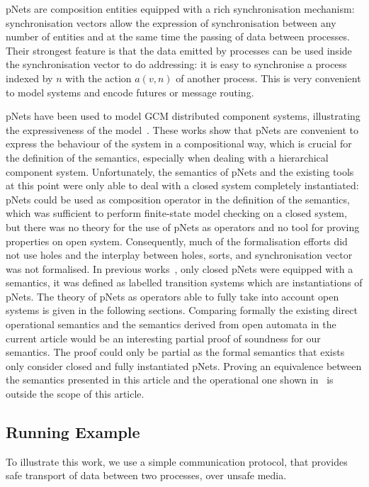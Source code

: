 \documentclass{lmcs}
\begin{document}
pNets are composition entities equipped with a rich synchronisation mechanism: synchronisation vectors allow the expression of synchronisation between any number of entities and at the same time the passing of data between processes. Their strongest feature is that the data emitted by processes can be used  inside the synchronisation vector to do addressing: it is easy to synchronise a process indexed by $n$ with the action $a(v,n)$ of another process. This is very convenient to model systems and encode futures or message routing. 

pNets have been used to model GCM distributed component systems, illustrating the expressiveness of the model~\cite{AmeurBoulifa2017}. 
These works show that pNets are convenient to express the behaviour of the system in a compositional way, which is crucial for the definition of the semantics, especially when dealing with a hierarchical component system. 
Unfortunately, the semantics of pNets and the existing tools at this point were only able to deal with a closed system completely instantiated: pNets could be used as composition operator in the definition of the semantics, which was sufficient to perform finite-state model checking on a closed system, but there was no theory for the use of pNets as operators and no tool for proving properties on open system. 
Consequently, much of the formalisation efforts did not use holes and the interplay between holes, sorts, and synchronisation vector was not formalised.
In previous works~\cite{AmeurBoulifa2017}, only closed pNets were equipped with a semantics, it was defined as labelled transition systems which are instantiations of pNets. 
The theory of pNets as operators able to fully take into account open systems is given in the following sections. Comparing formally the existing direct operational semantics and the semantics derived from open automata in the current article would be an interesting partial proof of soundness for our semantics. The proof could only be partial as the formal semantics that exists only consider closed and fully instantiated pNets. Proving 
an equivalence between the semantics presented in this article and the operational one shown in~\cite{AmeurBoulifa2017} is outside the scope of this article.



\subsection{Running Example}
To illustrate this work, we use a simple communication protocol, that provides safe transport of data between two processes, over unsafe media. 
\end{document}
